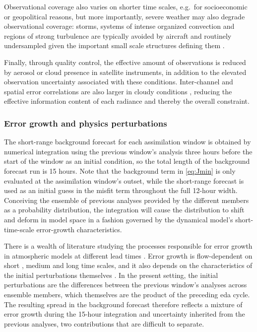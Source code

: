 Observational coverage also varies on shorter time scales, e.g.~for socioeconomic or geopolitical reasons, but more importantly, severe weather may also degrade observational coverage: storms, systems of intense organized convection and regions of strong turbulence are typically avoided by aircraft \parencite{moningerAutomatedMeteorologicalReports2003} and routinely undersampled given the important small scale structures defining them \parencite{janjicRepresentationErrorData2018, emanuelAtlanticTropicalCyclones2021, koEvaluationImprovementECMWF2025}.

Finally, through quality control, the effective amount of observations is reduced by aerosol or cloud presence in satellite instruments, in addition to the elevated observation uncertainty associated with these conditions. Inter-channel and spatial error correlations are also larger in cloudy conditions \parencite{bormannEstimatesObservationerrorCharacteristics2011}, reducing the effective information content of each radiance and thereby the overall constraint.

\subsubsection{Error growth and physics perturbations}\label{sec:EDA_err}

The short-range background forecast for each assimilation window is obtained by numerical integration using the previous window's analysis three hours before the start of the window as an initial condition, so the total length of the background forecast run is 15 hours. Note that the background term in \cref{eq:Jmin} is only evaluated at the assimilation window's outset, while the short-range forecast is used as an initial guess in the misfit term throughout the full 12-hour width. Conceiving the ensemble of previous analyses provided by the different members as a probability distribution, the integration will cause the distribution to shift and deform in model space in a fashion governed by the dynamical model's short-time-scale error-growth characteristics.

There is a wealth of literature studying the processes responsible for error growth in atmospheric models at different lead times \parencite{krishnamurthyPredictabilityWeatherClimate2019}. Error growth is flow-dependent on short \parencite{puhFlowDependenceForecast2024, rodwellUncertaintyGrowthForecast2023}, medium \parencite{baumgartProcessesGoverningAmplification2019, sanchezLinkingRapidForecast2020} and long \parencite{spaethFlowDependenceEnsembleSpread2024, osmanMultimodelAssessmentSubseasonal2023} time scales, and it also depends on the characteristics of the initial perturbations themselves \parencite{raynaudComparisonInitialPerturbation2016, wangImpactsMultiscaleComponents2023}. In the present setting, the initial perturbations are the differences between the previous window's analyses across ensemble members, which themselves are the product of the preceding \gls{eda} cycle. The resulting spread in the background forecast therefore reflects a mixture of error growth during the 15-hour integration and uncertainty inherited from the previous analyses, two contributions that are difficult to separate.

